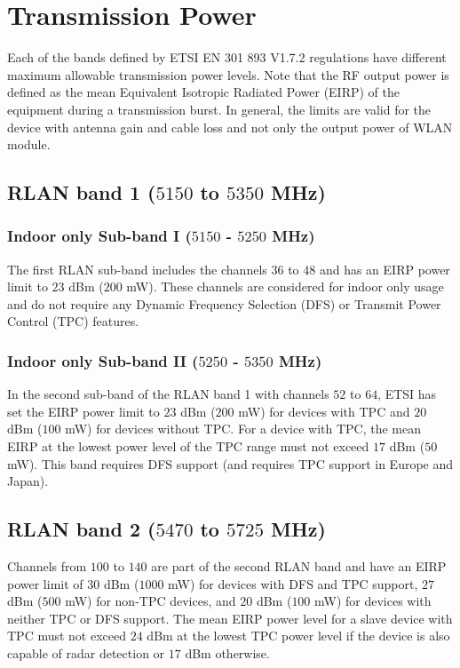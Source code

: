 \section{Transmission Power}

Each of the bands defined by ETSI EN 301 893 V1.7.2 regulations \cite{LBT-ETSI-2014} have different maximum allowable transmission power levels. Note that the RF output power is defined as the mean Equivalent Isotropic Radiated Power (EIRP) of the equipment during a transmission burst. In general, the limits are valid for the device with antenna gain and cable loss and not only the output power of WLAN module.

\subsection{RLAN band 1 ($5150$ to $5350$ MHz)} 

\subsubsection{Indoor only Sub-band I ($5150$ - $5250$ MHz)}
The first RLAN sub-band includes the channels $36$ to $48$ and has an EIRP power limit to $23$ dBm ($200$ mW). These channels are considered for indoor only usage and do not require any Dynamic Frequency Selection (DFS) or Transmit Power Control (TPC) features. 

\subsubsection{Indoor only Sub-band II ($5250$ - $5350$ MHz)}
In the second sub-band of the RLAN band 1 with channels $52$ to $64$, ETSI has set the EIRP power limit to $23$ dBm ($200$ mW) for devices with TPC and $20$ dBm ($100$ mW) for devices without TPC. For a device with TPC, the mean EIRP at the lowest power level of the TPC range must not exceed $17$ dBm ($50$ mW). This band requires DFS support (and requires TPC support in Europe and Japan).

\subsection{RLAN band 2 ($5470$ to $5725$ MHz)}

Channels from $100$ to $140$ are part of the second RLAN band and have an EIRP power limit of $30$ dBm ($1000$ mW) for devices with DFS and TPC support, $27$ dBm ($500$ mW) for non-TPC devices, and $20$ dBm ($100$ mW) for devices with neither TPC or DFS support. The mean EIRP power level for a slave device with TPC must not exceed $24$ dBm at the lowest TPC power level if the device is also capable of radar detection or $17$ dBm otherwise. 

